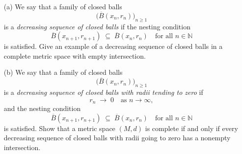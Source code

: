 \begin{problem}
    \begin{enumerate}

  \item[(a)] 
  We say that a family of closed balls 
\[
\bigl(\overline{B}(x_n,r_n)\bigr)_{n\ge 1}
\]
is a \emph{decreasing sequence of closed balls} if 
the nesting condition
\[
\overline{B}(x_{n+1},r_{n+1}) \;\subseteq\; \overline{B}(x_n,r_n)
\quad\text{for all } n\in\mathbb{N}
\]
is satisfied. Give an example of a decreasing sequence of closed balls in a complete metric space with empty intersection. 

  \item[(b)]  We say that a family of closed balls 
\[
\bigl(\overline{B}(x_n,r_n)\bigr)_{n\ge 1}
\]
is a \emph{decreasing sequence of closed balls with radii tending to zero} if 
\[
r_n \;\to\; 0 \quad\text{as } n\to\infty,
\]
and the nesting condition
\[
\overline{B}(x_{n+1},r_{n+1}) \;\subseteq\; \overline{B}(x_n,r_n)
\quad\text{for all } n\in\mathbb{N}
\]
is satisfied.
  Show that a metric space $(M,d)$ is complete if and only if every decreasing sequence of closed balls with radii going to zero has a nonempty intersection. \end{enumerate}
\end{problem}
